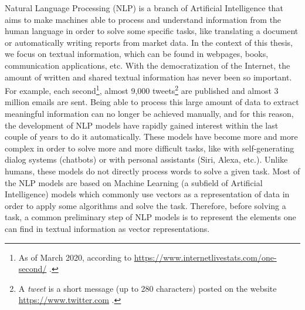 \fancyhead[LE]{\textbf{\thepage}}
\fancyhead[RO]{\textbf{\thepage}}

Natural Language Processing (NLP) is a branch of Artificial Intelligence that
aims to make machines able to process and understand information from the human
language in order to solve some specific tasks, like translating a document or
automatically writing reports from market data. In the context of this thesis,
we focus on textual information, which can be found in webpages, books,
communication applications, etc. With the democratization of the Internet, the
amount of written and shared textual information has never been so important.
For example, each second\footnote{As of March 2020, according to
\url{https://www.internetlivestats.com/one-second/} .}, almost 9,000
tweets\footnote{A \textit{tweet} is a short message (up to 280 characters)
posted on the website \url{https://www.twitter.com} .} are published and almost
3 million emails are sent. Being able to process this large amount of data to
extract meaningful information can no longer be achieved manually, and for this
reason, the development of NLP models have rapidly gained interest within the
last couple of years to do it automatically. These models have become more and
more complex in order to solve more and more difficult tasks, like with
self-generating dialog systems (chatbots) or with personal assistants (Siri,
Alexa, etc.). Unlike humans, these models do not directly process words to solve
a given task. Most of the NLP models are based on Machine Learning (a
subfield of Artificial Intelligence) models which commonly use vectors as a
representation of data in order to apply some algorithms and solve the task.
Therefore, before solving a task, a common preliminary step of NLP models is to
represent the elements one can find in textual information as vector
representations. \medskip

